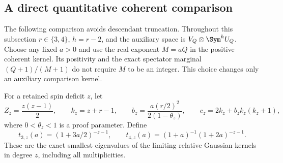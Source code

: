 \subsection{A direct quantitative coherent comparison}
\label{app:optimized-coherent}

The following comparison avoids descendant truncation. Throughout this
subsection $r\in\{3,4\}$, $h=r-2$, and the auxiliary space is
$V_Q\otimes\Sym^hU_Q$. Choose any fixed $a>0$ and use the real exponent
$M=aQ$ in the positive coherent kernel. Its positivity and the exact
spectator marginal $(Q+1)/(M+1)$ do not require $M$ to be an integer.
This choice changes only an auxiliary comparison kernel.

For a retained spin deficit $z$, let
\begin{equation}\label{eq:opt-coh-parameters}
 Z_z=\frac{z(z-1)}2,\qquad k_z=z+r-1,\qquad
 b_z=\frac{a(r/2)^2}{2(1-\theta_z)},\qquad
 c_z=2k_z+b_zk_z(k_z+1),
\end{equation}
where $0<\theta_z<1$ is a proof parameter. Define
\begin{equation}
 t_{3,z}(a)=(1+3a/2)^{-z-1},\qquad
 t_{4,z}(a)=(1+a)^{-1}(1+2a)^{-z-1}.
\end{equation}
These are the exact smallest eigenvalues of the limiting relative
Gaussian kernels in degree $z$, including all multiplicities.

